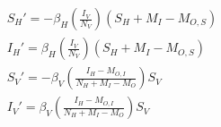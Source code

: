 \[
\begin{aligned}
    {S_H}' = - \beta_H(\frac{I_V}{N_V})(S_H + M_I - M_{O,S}) \\
    {I_H}' = \beta_H(\frac{I_V}{N_V})(S_H + M_I - M_{O,S}) \\
    {S_V}' = - \beta_V(\frac{I_H - M_{O,I}}{N_H + M_I - M_O})S_V \\
    {I_V}' = \beta_V(\frac{I_H - M_{O,I}}{N_H + M_I - M_O})S_V
\end{aligned}
\]

